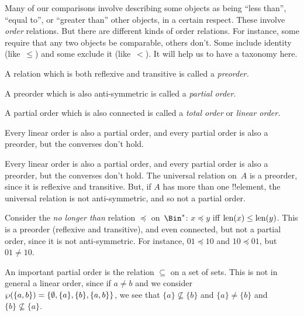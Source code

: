 \documentclass[../../../include/open-logic-section]{subfiles}
\begin{document}

\begin{explain}
Many of our comparisons involve describing some objects as being
``less than'', ``equal to'', or ``greater than'' other objects, in a
certain respect. These involve \emph{order} relations. But there are
different kinds of order relations. For instance, some require that
any two objects be comparable, others don't. Some include identity
(like~$\le$) and some exclude it (like~$<$). It will help us to have a
taxonomy here.
\end{explain}

\begin{defn}[Preorder]
A relation which is both reflexive and transitive is called a
\emph{preorder.}  
\end{defn}

\begin{defn}
A preorder which is also anti-symmetric is called a
\emph{partial order}.
\end{defn}

\begin{defn}
A partial order which is also connected is called a
\emph{total order} or \emph{linear order.}
\end{defn}

Every linear order is also a partial order, and every partial order is
also a preorder, but the converses don't hold.

\begin{ex}
Every linear order is also a partial order, and every partial order is
also a preorder, but the converses don't hold. The universal relation
on~$A$ is a preorder, since it is reflexive and transitive. But, if
$A$ has more than one !!{element}, the universal relation is not
anti-symmetric, and so not a partial order.
\end{ex}

\begin{ex}
Consider the \emph{no longer than} relation $\preccurlyeq$
on~$\Bin^*$: $x \preccurlyeq y$ iff $\mathrm{len}(x) \le \mathrm{len}(y)$. This is a
preorder (reflexive and transitive), and even connected, but not a
partial order, since it is not anti-symmetric. For instance, $01
\preccurlyeq 10$ and $10 \preccurlyeq 01$, but $01 \neq 10$.
\end{ex}

\begin{ex}
An important partial order is the relation $\subseteq$ on a set of
sets. This is not in general a linear order, since if $a \neq b$ and
we consider $\wp(\{a, b\}) = \{\emptyset, \{a\}, \{b\}, \{a,b\}\}$,
we see that $\{a\} \nsubseteq \{b\}$ and $\{a\} \neq \{b\}$ and $\{b\}
\nsubseteq \{a\}$.
\end{ex}
\end{document}
